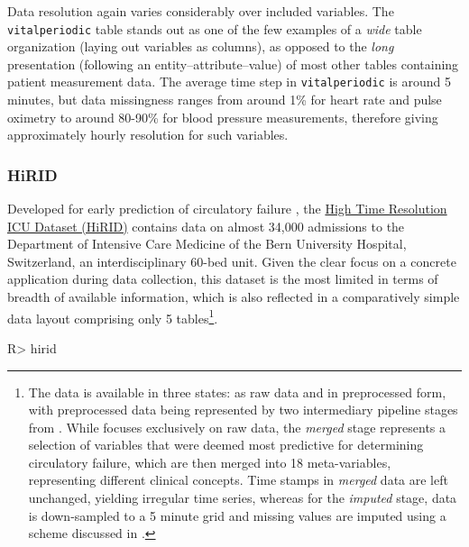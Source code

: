 \documentclass[
]{jss}
\begin{document}
Data resolution again varies considerably over included variables. The
\texttt{vitalperiodic} table stands out as one of the few examples of a
\emph{wide} table organization (laying out variables as columns), as
opposed to the \emph{long} presentation (following an
entity--attribute--value) of most other tables containing patient
measurement data. The average time step in \texttt{vitalperiodic} is
around 5 minutes, but data missingness ranges from around 1\% for heart
rate and pulse oximetry to around 80-90\% for blood pressure
measurements, therefore giving approximately hourly resolution for such
variables.

\hypertarget{hirid}{%
\subsubsection{HiRID}\label{hirid}}

Developed for early prediction of circulatory failure
\citep{hyland2020}, the
\href{https://physionet.org/content/hirid/1.0/}{High Time Resolution ICU
Dataset (HiRID)} contains data on almost 34,000 admissions to the
Department of Intensive Care Medicine of the Bern University Hospital,
Switzerland, an interdisciplinary 60-bed unit. Given the clear focus on
a concrete application during data collection, this dataset is the most
limited in terms of breadth of available information, which is also
reflected in a comparatively simple data layout comprising only 5
tables\footnote{The data is available in three states: as raw data and
  in preprocessed form, with preprocessed data being represented by two
  intermediary pipeline stages from \citep{hyland2020}. While 
  focuses exclusively on raw data, the \emph{merged} stage represents a
  selection of variables that were deemed most predictive for
  determining circulatory failure, which are then merged into 18
  meta-variables, representing different clinical concepts. Time stamps
  in \emph{merged} data are left unchanged, yielding irregular time
  series, whereas for the \emph{imputed} stage, data is down-sampled to
  a 5 minute grid and missing values are imputed using a scheme
  discussed in \citep{hyland2020}.}.

\begin{CodeChunk}
\begin{CodeInput}
R> hirid
\end{CodeInput}
\end{CodeChunk}
\end{document}
